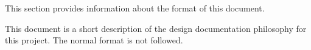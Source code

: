 
This section provides information about the format of this document.

This document is a short description of the design documentation philosophy for this project.
The normal \SDP format is not followed.

